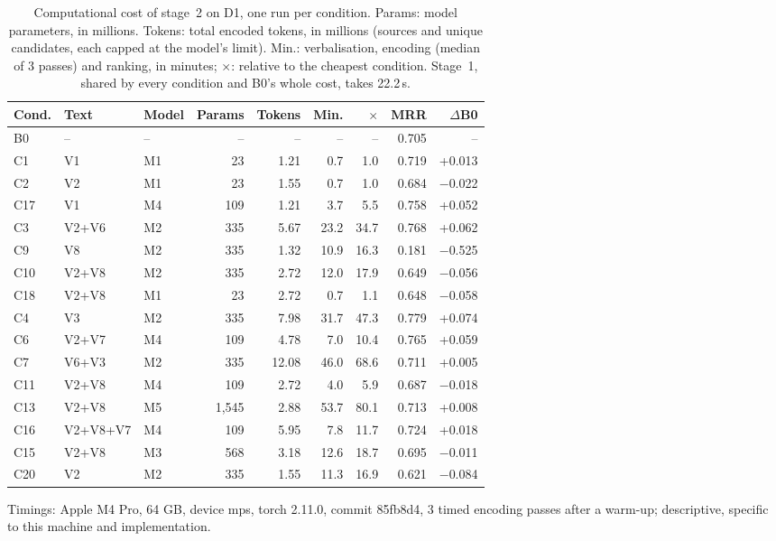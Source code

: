 \begin{table}[t]
\centering
\footnotesize
\setlength{\tabcolsep}{4pt}
\begin{threeparttable}
\caption{Computational cost of stage~2 on D1, one run per condition. Params: model parameters, in millions. Tokens: total encoded tokens, in millions (sources and unique candidates, each capped at the model's limit). Min.: verbalisation, encoding (median of 3 passes) and ranking, in minutes; $\times$: relative to the cheapest condition. Stage~1, shared by every condition and B0's whole cost, takes 22.2\,s.}
\label{tab:cost_d1}
\begin{tabular}{lllrrrrrr}
\hline
\textbf{Cond.} & \textbf{Text} & \textbf{Model} & \textbf{Params} & \textbf{Tokens} & \textbf{Min.} & $\times$ & \textbf{MRR} & $\Delta$\textbf{B0} \\
\hline
B0 & -- & -- & -- & -- & -- & -- & 0.705 & -- \\
C1 & V1 & M1 & 23 & 1.21 & 0.7 & 1.0 & 0.719 & +0.013 \\
C2 & V2 & M1 & 23 & 1.55 & 0.7 & 1.0 & 0.684 & $-$0.022 \\
C17 & V1 & M4 & 109 & 1.21 & 3.7 & 5.5 & 0.758 & +0.052 \\
C3 & V2+V6 & M2 & 335 & 5.67 & 23.2 & 34.7 & 0.768 & +0.062 \\
C9 & V8 & M2 & 335 & 1.32 & 10.9 & 16.3 & 0.181 & $-$0.525 \\
C10 & V2+V8 & M2 & 335 & 2.72 & 12.0 & 17.9 & 0.649 & $-$0.056 \\
C18 & V2+V8 & M1 & 23 & 2.72 & 0.7 & 1.1 & 0.648 & $-$0.058 \\
C4 & V3 & M2 & 335 & 7.98 & 31.7 & 47.3 & 0.779 & +0.074 \\
C6 & V2+V7 & M4 & 109 & 4.78 & 7.0 & 10.4 & 0.765 & +0.059 \\
C7 & V6+V3 & M2 & 335 & 12.08 & 46.0 & 68.6 & 0.711 & +0.005 \\
C11 & V2+V8 & M4 & 109 & 2.72 & 4.0 & 5.9 & 0.687 & $-$0.018 \\
C13 & V2+V8 & M5 & 1{,}545 & 2.88 & 53.7 & 80.1 & 0.713 & +0.008 \\
C16 & V2+V8+V7 & M4 & 109 & 5.95 & 7.8 & 11.7 & 0.724 & +0.018 \\
C15 & V2+V8 & M3 & 568 & 3.18 & 12.6 & 18.7 & 0.695 & $-$0.011 \\
C20 & V2 & M2 & 335 & 1.55 & 11.3 & 16.9 & 0.621 & $-$0.084 \\
\hline
\end{tabular}
\begin{tablenotes}\footnotesize
\item Timings: Apple M4 Pro, 64 GB, device mps, torch 2.11.0, commit 85fb8d4, 3 timed encoding passes after a warm-up; descriptive, specific to this machine and implementation.
\end{tablenotes}
\end{threeparttable}
\end{table}
